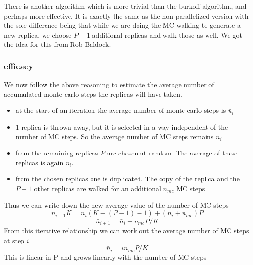 \documentclass[a4paper]{article}
\begin{document}
There is another algorithm which is more trivial than the burkoff algorithm, and perhaps more effective.  
It is exactly the same as the non parallelized version with the sole difference being that while
we are doing the MC walking to generate a new replica, we choose $P-1$
additional replicas and walk those as well.  We got the idea for this from Rob Baldock.  

\subsubsection{efficacy}

We now follow the above reasoning to estimate the average number of accumulated monte carlo steps 
the replicas will have taken.

\begin{itemize}
  \item at the start of an iteration the average number of monte carlo steps is $\bar{n}_i$

  \item 1 replica is thrown away, but it is selected in a way independent of the
    number of MC steps.  So the average number of MC steps remains $\bar{n}_i$
    
  \item from the remaining replicas $P$ are chosen at random.  The average of these
    replicas is again $\bar{n}_i$.

  \item from the chosen replicas one is duplicated. The copy of the replica and
    the $P-1$ other replicas are  walked for an additional $n_{mc}$ MC steps
\end{itemize}

Thus we can write down the new average value of the number of MC steps
\begin{equation}
  \bar{n}_{i+1} K = \bar{n}_i  (K - (P-1)-1) + (\bar{n}_i + n_{mc}) P
\end{equation}
\begin{equation}
  \bar{n}_{i+1} = \bar{n}_i  +  n_{mc} P / K
  \label{eqn:par_iter}
\end{equation}
From this iterative relationship we can work out the average number of
MC steps at step $i$
\begin{equation}
  \bar{n}_{i} = i n_{mc} P / K
\end{equation}
This is linear in P and grows linearly with the number of MC steps.



\end{document}
